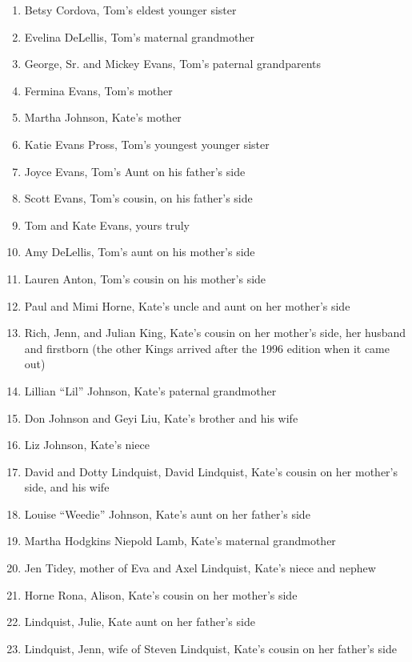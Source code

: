 \documentclass[12pt]{article}
\begin{document}
\begin{enumerate}
 \itemsep0pt
 \parskip1pt
\item Betsy Cordova, Tom's eldest younger sister %
\item Evelina DeLellis, Tom's maternal grandmother
\item George, Sr. and Mickey Evans, Tom's paternal grandparents
\item Fermina Evans, Tom's mother %
\item Martha Johnson, Kate's mother
\item Katie Evans Pross, Tom's youngest younger sister
\item Joyce Evans, Tom's Aunt on his father's side
\item Scott Evans, Tom's cousin, on his father's side
\item Tom and Kate Evans, yours truly %
\item Amy DeLellis, Tom's aunt on his mother's side
\item Lauren Anton, Tom's cousin on his mother's side
\item Paul and Mimi Horne, Kate's uncle and aunt on her mother's side %
\item Rich, Jenn, and Julian King, Kate's cousin on her mother's side, her husband and firstborn (the other Kings arrived after the 1996 edition when it came out)
\item Lillian ``Lil'' Johnson, Kate's paternal grandmother
\item Don Johnson and Geyi Liu, Kate's brother and his wife
\item Liz Johnson, Kate's niece
\item David and Dotty Lindquist, David Lindquist, Kate's cousin on her mother's side, and his wife
\item Louise ``Weedie'' Johnson, Kate's aunt on her father's side
\item Martha Hodgkins Niepold Lamb, Kate's maternal grandmother
\item Jen Tidey, mother of Eva and Axel Lindquist, Kate's niece and nephew
\item Horne Rona, Alison, Kate's cousin on her mother's side
\item Lindquist, Julie, Kate aunt on her father's side
\item Lindquist, Jenn, wife of Steven Lindquist, Kate's cousin on her father's side

\end{enumerate}


\printindex

\end{document}
